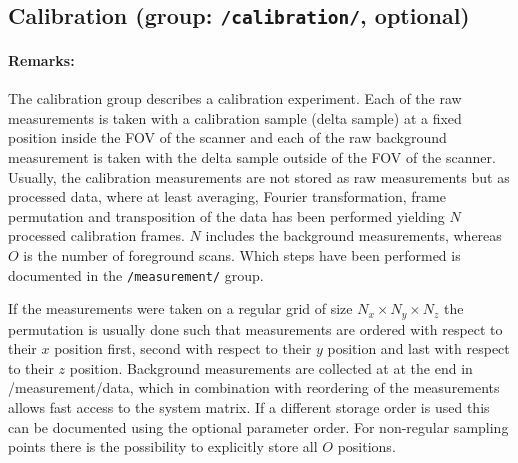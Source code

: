 \documentclass[landscape,a4paper]{article} %
\newcommand{\inl}[1]{\lstinline[columns=fixed]{#1}}
\newcommand{\inlvar}[1]{{\ttfamily#1}}
\begin{document}
\subsection{Calibration (group: \inl{/calibration/}, optional)}

\begin{multicols}{2}
\paragraph{Remarks:}
The calibration group describes a calibration experiment. Each of the raw measurements is taken with a calibration sample (delta sample) at a fixed position inside the FOV of the scanner and each of the raw background measurement is taken with the delta sample outside of the FOV of the scanner. Usually, the calibration measurements are not stored as raw measurements but as processed data, where at least averaging, Fourier transformation, frame permutation and transposition of the data has been performed yielding $N$ processed calibration frames. $N$ includes the background measurements, whereas $O$ is the number of foreground scans. Which steps have been performed is documented in the \inl{/measurement/} group.

If the measurements were taken on a regular grid of size $N_x \times N_y \times N_z$ the permutation is usually done such that measurements are ordered with respect to their $x$ position first, second with respect to their $y$ position and last with respect to their $z$ position. Background measurements are collected at at the end in \inlvar{/measurement/data}, which in combination with reordering of the measurements allows fast access to the system matrix. If a different storage order is used this can be documented using the optional parameter \inlvar{order}. For non-regular sampling points there is the possibility to explicitly store all $O$ positions.
\end{multicols}
\end{document}
